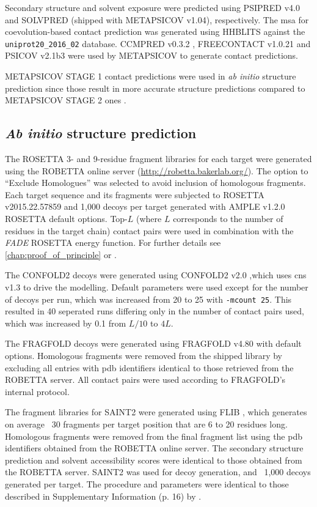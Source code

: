 Secondary structure and solvent exposure were predicted using PSIPRED v4.0 \cite{Jones1999-ed} and SOLVPRED (shipped with METAPSICOV v1.04), respectively. The \gls{msa} for coevolution-based contact prediction was generated using HHBLITS \cite{Remmert2011-kt} against the \texttt{uniprot20\_2016\_02} database. CCMPRED v0.3.2 \cite{Seemayer2014-zp}, FREECONTACT v1.0.21 \cite{Kajan2014-bx} and PSICOV v2.1b3 \cite{Jones2012-ks} were used by METAPSICOV to generate contact predictions.

METAPSICOV STAGE 1 contact predictions were used in \textit{ab initio} structure prediction since those result in more accurate structure predictions compared to METAPSICOV STAGE 2 ones \cite{Jones2015-vq}.

\subsection{\textit{Ab initio} structure prediction} \label{sec:ample_saint2_modelling}
The ROSETTA 3- and 9-residue fragment libraries for each target were generated using the ROBETTA online server (\url{http://robetta.bakerlab.org/}). The option to ``Exclude Homologues'' was selected to avoid inclusion of homologous fragments. Each target sequence and its fragments were subjected to ROSETTA v2015.22.57859 \cite{Rohl2004-dj} and 1,000 decoys per target generated with AMPLE v1.2.0 ROSETTA default options. Top-$L$ (where $L$ corresponds to the number of residues in the target chain) contact pairs were used in combination with the \textit{FADE} ROSETTA energy function. For further details see \cref{chap:proof_of_principle} or \textcite{Michel2014-eg}.

The CONFOLD2 decoys were generated using CONFOLD2 v2.0 \cite{Adhikari2018-lj},which uses \gls{cns} v1.3 \cite{Brunger1998-sz} to drive the modelling. Default parameters were used except for the number of decoys per run, which was increased from 20 to 25 with \texttt{-mcount 25}. This resulted in 40 seperated runs differing only in the number of contact pairs used, which was increased by 0.1 from $L/10$ to $4L$.

The FRAGFOLD decoys were generated using FRAGFOLD v4.80 \cite{Jones2001-mc} with default options. Homologous fragments were removed from the shipped library  by excluding all entries with \gls{pdb} identifiers identical to those retrieved from the ROBETTA server. All contact pairs were used according to FRAGFOLD's internal protocol.

The fragment libraries for SAINT2 were generated using FLIB \cite{De_Oliveira2015-kb}, which generates on average ~30 fragments per target position that are 6 to 20 residues long. Homologous fragments were removed from the final fragment list using the \gls{pdb} identifiers obtained from the ROBETTA online server. The secondary structure prediction and solvent accessibility scores were identical to those obtained from the ROBETTA server. SAINT2 was used for decoy generation, and ~1,000 decoys generated per target. The procedure and parameters were identical to those described in Supplementary Information (p. 16) by \textcite{De_Oliveira2017-sg}.

